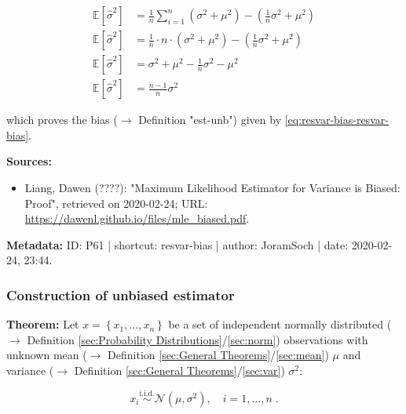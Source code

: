 \documentclass[a4paper,12pt,twoside]{book}
\begin{document}
\begin{equation} \label{eq:resvar-bias-E-resvar-mle-s3}
\begin{split}
\mathbb{E}\left[ \hat{\sigma}^2 \right] &= \frac{1}{n} \sum_{i=1}^{n} \left( \sigma^2 + \mu^2 \right) - \left( \frac{1}{n} \sigma^2 + \mu^2 \right) \\
\mathbb{E}\left[ \hat{\sigma}^2 \right] &= \frac{1}{n} \cdot n \cdot \left( \sigma^2 + \mu^2 \right) - \left( \frac{1}{n} \sigma^2 + \mu^2 \right) \\
\mathbb{E}\left[ \hat{\sigma}^2 \right] &= \sigma^2 + \mu^2 - \frac{1}{n} \sigma^2 - \mu^2 \\
\mathbb{E}\left[ \hat{\sigma}^2 \right] &= \frac{n-1}{n} \sigma^2
\end{split}
\end{equation}

which proves the bias ($\rightarrow$ Definition "est-unb") given by \eqref{eq:resvar-bias-resvar-bias}.



\vspace{1em}
\textbf{Sources:}
\begin{itemize}
\item Liang, Dawen (????): "Maximum Likelihood Estimator for Variance is Biased: Proof", retrieved on 2020-02-24; URL: \url{https://dawenl.github.io/files/mle_biased.pdf}.
\end{itemize}


\vspace{1em}
\textbf{Metadata:} ID: P61 | shortcut: resvar-bias | author: JoramSoch | date: 2020-02-24, 23:44.
\vspace{1em}



\subsubsection[\textbf{Construction of unbiased estimator}]{Construction of unbiased estimator} \label{sec:resvar-unb}
\setcounter{equation}{0}

\textbf{Theorem:} Let $x = \left\lbrace x_1, \ldots, x_n \right\rbrace$ be a set of independent normally distributed ($\rightarrow$ Definition \ref{sec:Probability Distributions}/\ref{sec:norm}) observations with unknown mean ($\rightarrow$ Definition \ref{sec:General Theorems}/\ref{sec:mean}) $\mu$ and variance ($\rightarrow$ Definition \ref{sec:General Theorems}/\ref{sec:var}) $\sigma^2$:

\begin{equation} \label{eq:resvar-unb-ug}
x_i \overset{\text{i.i.d.}}{\sim} \mathcal{N}(\mu, \sigma^2), \quad i = 1,\ldots,n \; .
\end{equation}
\end{document}
